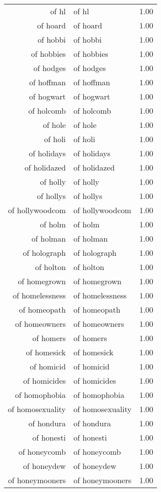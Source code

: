 \begin{table}[ht]
\begin{tabular}{rlr}
  of hl & of hl & 1.00 \\ 
  of hoard & of hoard & 1.00 \\ 
  of hobbi & of hobbi & 1.00 \\ 
  of hobbies & of hobbies & 1.00 \\ 
  of hodges & of hodges & 1.00 \\ 
  of hoffman & of hoffman & 1.00 \\ 
  of hogwart & of hogwart & 1.00 \\ 
  of holcomb & of holcomb & 1.00 \\ 
  of hole & of hole & 1.00 \\ 
  of holi & of holi & 1.00 \\ 
  of holidays & of holidays & 1.00 \\ 
  of holidazed & of holidazed & 1.00 \\ 
  of holly & of holly & 1.00 \\ 
  of hollys & of hollys & 1.00 \\ 
  of hollywoodcom & of hollywoodcom & 1.00 \\ 
  of holm & of holm & 1.00 \\ 
  of holman & of holman & 1.00 \\ 
  of holograph & of holograph & 1.00 \\ 
  of holton & of holton & 1.00 \\ 
  of homegrown & of homegrown & 1.00 \\ 
  of homelessness & of homelessness & 1.00 \\ 
  of homeopath & of homeopath & 1.00 \\ 
  of homeowners & of homeowners & 1.00 \\ 
  of homers & of homers & 1.00 \\ 
  of homesick & of homesick & 1.00 \\ 
  of homicid & of homicid & 1.00 \\ 
  of homicides & of homicides & 1.00 \\ 
  of homophobia & of homophobia & 1.00 \\ 
  of homosexuality & of homosexuality & 1.00 \\ 
  of hondura & of hondura & 1.00 \\ 
  of honesti & of honesti & 1.00 \\ 
  of honeycomb & of honeycomb & 1.00 \\ 
  of honeydew & of honeydew & 1.00 \\ 
  of honeymooners & of honeymooners & 1.00 \\ 

\end{tabular}
\end{table}
